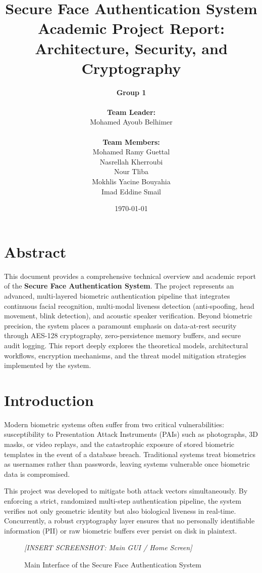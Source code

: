 \documentclass[12pt,a4paper]{article}
\title{
    \vspace*{2cm}
    \Huge\textbf{Secure Face Authentication System}\\ 
    \vspace{1cm}
    \Large\textbf{Academic Project Report: Architecture, Security, and Cryptography}\\
    \vspace{2cm}
}
\author{
    \textbf{Group 1}\\
    \vspace{0.5cm}\\
    \textbf{Team Leader:}\\
    Mohamed Ayoub Belhimer\\
    \vspace{0.5cm}\\
    \textbf{Team Members:}\\
    Mohamed Ramy Guettal\\
    Nasrellah Kherroubi\\
    Nour Tliba\\
    Mokhlis Yacine Bouyahia\\
    Imad Eddine Smail
}
\date{\vspace{2cm}\today}
\begin{document}
\maketitle
\thispagestyle{empty}
\newpage

\tableofcontents
\newpage

\section{Abstract}
This document provides a comprehensive technical overview and academic report of the \textbf{Secure Face Authentication System}. The project represents an advanced, multi-layered biometric authentication pipeline that integrates continuous facial recognition, multi-modal liveness detection (anti-spoofing, head movement, blink detection), and acoustic speaker verification. Beyond biometric precision, the system places a paramount emphasis on data-at-rest security through AES-128 cryptography, zero-persistence memory buffers, and secure audit logging. This report deeply explores the theoretical models, architectural workflows, encryption mechanisms, and the threat model mitigation strategies implemented by the system.

\section{Introduction}
Modern biometric systems often suffer from two critical vulnerabilities: susceptibility to Presentation Attack Instruments (PAIs) such as photographs, 3D masks, or video replays, and the catastrophic exposure of stored biometric templates in the event of a database breach. Traditional systems treat biometrics as usernames rather than passwords, leaving systems vulnerable once biometric data is compromised.

This project was developed to mitigate both attack vectors simultaneously. By enforcing a strict, randomized multi-step authentication pipeline, the system verifies not only geometric identity but also biological liveness in real-time. Concurrently, a robust cryptography layer ensures that no personally identifiable information (PII) or raw biometric buffers ever persist on disk in plaintext.

\begin{figure}[H]
    \centering
    \colorbox{placeholderbg}{\parbox{0.8\textwidth}{\centering \vspace{3cm} \textit{[INSERT SCREENSHOT: Main GUI / Home Screen]} \vspace{3cm}}}
    \caption{Main Interface of the Secure Face Authentication System}
    \label{fig:main_gui}
\end{figure}
\end{document}
